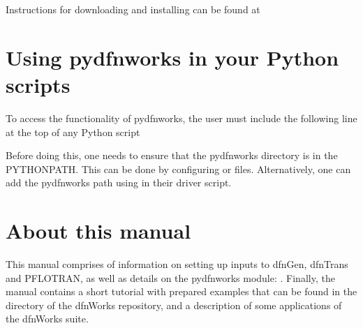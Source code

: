 \documentclass[letterpaper,10pt,english]{sphinxmanual}
\begin{document}
Instructions for downloading and installing  can be found at


\section{Using pydfnworks in your Python scripts}
\label{\detokenize{intro:using-pydfnworks-in-your-python-scripts}}
To access the functionality of pydfnworks, the user must include the
following line at the
top of any Python script

%
\begin{sphinxVerbatim}[commandchars=\\\{\}]
 
\end{sphinxVerbatim}

Before doing this, one needs to ensure that the pydfnworks directory is in the
PYTHONPATH. This can be done by configuring  or  files.
Alternatively, one can add the pydfnworks path using 
in their driver script.


\section{About this  manual}
\label{\detokenize{intro:about-this-manual}}
This manual comprises of information on setting up inputs to dfnGen, dfnTrans
and PFLOTRAN, as well as details on the pydfnworks module: {\hyperref[\detokenize{pydfnworks:dfnworks-python-chapter}]{}}. Finally, the manual contains a short tutorial
with prepared examples that  can be found in the  directory of the
dfnWorks repository, and a description of some applications of the dfnWorks
suite.
\end{document}
